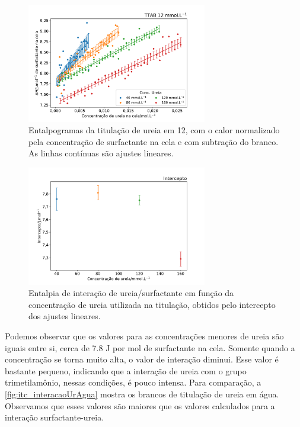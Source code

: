 \begin{figure}[h]
	\centering
	\includegraphics[width=0.7\textwidth]{imagens/itc/interacao_ureia_surf}
	\caption{Entalpogramas da titulação de ureia em \TTAB{} 12\mM, com o calor normalizado pela concentração de surfactante na cela e com subtração do branco. As linhas contínuas são ajustes lineares.}
	\label{fig:itc_interacaoUrSurf_entalpograma}
\end{figure}


\begin{figure}[h]
	\centering
	\includegraphics[width=0.7\textwidth]{imagens/itc/interacao_intercepto}
	\caption{Entalpia de interação de ureia/surfactante em função da concentração de ureia utilizada na titulação, obtidos pelo intercepto dos ajustes lineares.}
	\label{fig:itc_interacaoUrSurf_intercepto}
\end{figure}

	Podemos observar que os valores para as concentrações menores de ureia são iguais entre si, cerca de 7.8 J por mol de surfactante na cela. Somente quando a concentração se torna muito alta, o valor de interação diminui. Esse valor é bastante pequeno, indicando que a interação de ureia com o grupo trimetilamônio, nessas condições, é pouco intensa. Para comparação, a \autoref{fig:itc_interacaoUrAgua} mostra os brancos de titulação de ureia em água. Observamos que esses valores são maiores que os valores calculados para a interação surfactante-ureia.
	

